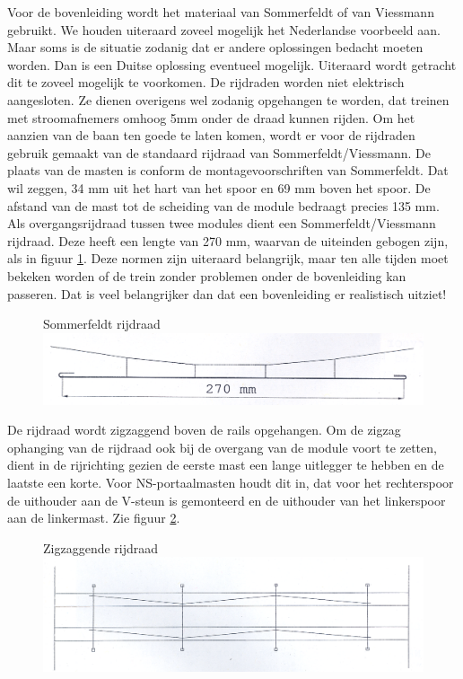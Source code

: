 \documentclass[12pt,a4paper]{report}
\begin{document}
Voor de bovenleiding wordt het materiaal van Sommerfeldt of van Viessmann gebruikt. We houden uiteraard zoveel mogelijk het Nederlandse voorbeeld aan. Maar soms is de situatie zodanig dat er andere oplossingen bedacht moeten worden. Dan is een Duitse oplossing eventueel mogelijk. Uiteraard wordt getracht dit te zoveel mogelijk te voorkomen. De rijdraden worden niet elektrisch aangesloten. Ze dienen overigens wel zodanig opgehangen te worden, dat treinen met stroomafnemers omhoog 5mm onder de draad kunnen rijden. Om het aanzien van de baan ten goede te laten komen, wordt er voor de rijdraden gebruik gemaakt van de standaard rijdraad van Sommerfeldt/Viessmann. De plaats van de masten is conform de montagevoorschriften van Sommerfeldt. Dat wil zeggen, 34 mm uit het hart van het spoor en 69 mm boven het spoor. De afstand van de mast tot de scheiding van de module bedraagt precies 135 mm. Als overgangsrijdraad tussen twee modules dient een Sommerfeldt/Viessmann rijdraad. Deze heeft een lengte van 270 mm, waarvan de uiteinden gebogen zijn, als in figuur \ref{figuur9}. Deze normen zijn uiteraard belangrijk, maar ten alle tijden moet bekeken worden of de trein zonder problemen onder de bovenleiding kan passeren. Dat is veel belangrijker dan dat een bovenleiding er realistisch uitziet!

\begin{figure}[ht]
  \captionbox
  {Sommerfeldt rijdraad\label{figuur9}}
  {\includegraphics[scale=1.0]{images/rcu_figuur9}}
\end{figure}

De rijdraad wordt zigzaggend boven de rails opgehangen. Om de zigzag ophanging van de rijdraad ook bij de overgang van de module voort te zetten, dient in de rijrichting gezien de eerste mast een lange uitlegger te hebben en de laatste een korte. Voor NS-portaalmasten houdt dit in, dat voor het rechterspoor de uithouder aan de V-steun is gemonteerd en de uithouder van het linkerspoor aan de linkermast. Zie figuur \ref{figuur10}.

\begin{figure}[ht]
  \captionbox
  {Zigzaggende rijdraad\label{figuur10}}
  {\includegraphics[scale=1.0]{images/rcu_figuur10}}
\end{figure}
\end{document}
